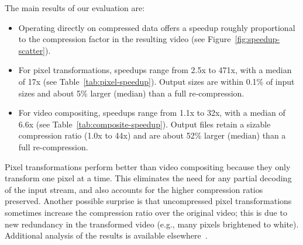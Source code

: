 The main results of our evaluation are:
\begin{itemize}

\item \vspace{-2mm} Operating directly on compressed data offers a
  speedup roughly proportional to the compression factor in the
  resulting video (see Figure~\ref{fig:speedup-scatter}).

\item \vspace{-2mm} For pixel transformations, speedups range from
  2.5x to 471x, with a median of 17x (see
  Table~\ref{tab:pixel-speedup}).  Output sizes are within 0.1\% of
  input sizes and about 5\% larger (median) than a full
  re-compression.

\item \vspace{-2mm} For video compositing, speedups range from 1.1x to
  32x, with a median of 6.6x (see Table~\ref{tab:composite-speedup}).
  Output files retain a sizable compression ratio (1.0x to 44x) and
  are about 52\% larger (median) than a full re-compression.\vspace{-2mm}

\end{itemize}

\noindent Pixel transformations perform better than video compositing
because they only transform one pixel at a time.  This eliminates the
need for any partial decoding of the input stream, and also accounts
for the higher compression ratios preserved.  Another possible
surprise is that uncompressed pixel transformations sometimes increase
the compression ratio over the original video; this is due to new
redundancy in the transformed video (e.g., many pixels brightened to
white).  Additional analysis of the results is available
elsewhere~\cite{techreport}.
